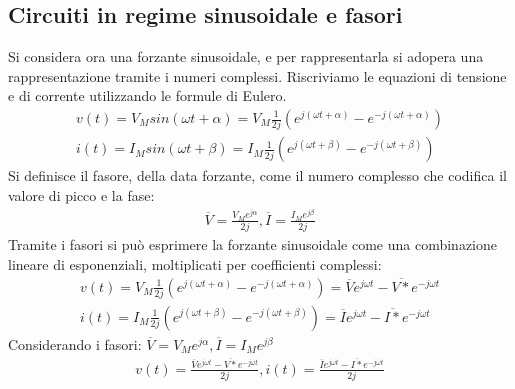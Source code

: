 \documentclass{article}
\numberwithin{equation}{subsection}
\begin{document}
\subsection{Circuiti in regime sinusoidale e fasori}
Si considera ora una forzante sinusoidale, e per rappresentarla si adopera una rappresentazione tramite i numeri complessi. Riscriviamo le equazioni di tensione e di corrente utilizzando le formule di Eulero.
\begin{gather*}
    v(t)=V_Msin(\omega t+ \alpha) = V_M \frac{1}{2j}(e^{j(\omega t+ \alpha)} - e^{-j(\omega t+ \alpha)})\\
    i(t) =I_Msin(\omega t+ \beta) = I_M \frac{1}{2j}(e^{j(\omega t+ \beta)} - e^{-j(\omega t+ \beta)})
\end{gather*}
Si definisce il fasore, della data forzante, come il numero complesso che codifica il valore di picco e la fase:
\begin{gather*}
    \overline{V}= \frac{V_Me^{j\alpha}}{2j},  \overline{I} = \frac{I_Me^{j\beta}}{2j}
\end{gather*}
Tramite i fasori si può esprimere la forzante sinusoidale come una combinazione lineare di esponenziali, moltiplicati per coefficienti complessi:
\begin{gather*}
    v(t)= V_M \frac{1}{2j}(e^{j(\omega t+ \alpha)} - e^{-j(\omega t+ \alpha)})=\overline{V}e^{j\omega t}- \overline{V*}e^{-j\omega t}\\
    i(t) = I_M \frac{1}{2j}(e^{j(\omega t+ \beta)} - e^{-j(\omega t+ \beta)})=\overline{I}e^{j\omega t}- \overline{I*}e^{-j\omega t}
\end{gather*}
Considerando i fasori: $\overline{V}= V_Me^{j\alpha}, \overline{I}= I_Me^{j\beta}$
\begin{gather*}
    v(t) = \frac{\overline{V}e^{j\omega t}- \overline{V*}e^{-j\omega t}}{2j},i(t)= \frac{\overline{I}e^{j\omega t}- \overline{I*}e^{-j\omega t}}{2j}
\end{gather*}
\end{document}
